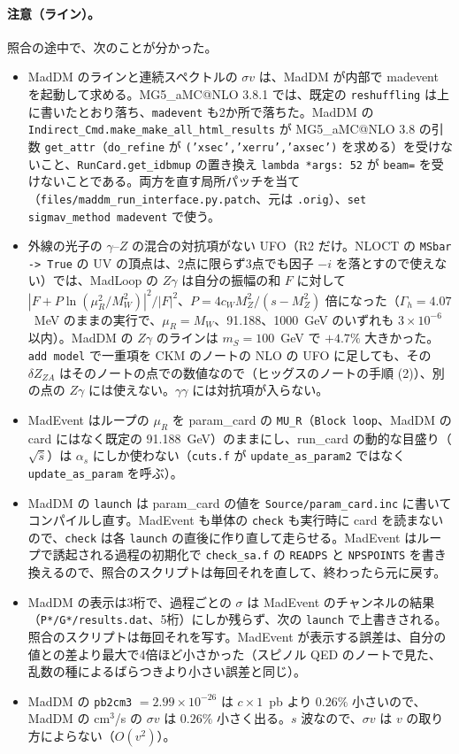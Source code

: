 \documentclass[a4paper,10pt]{ltjsarticle}
\makeatletter
\newcommand{\MGaMC}{MG5\_aMC@NLO}
\makeatother
\begin{document}
\paragraph{注意（ライン）。}照合の途中で、次のことが分かった。
\begin{itemize}
\item MadDM のラインと連続スペクトルの $\sigma v$ は、MadDM が内部で madevent を起動して求める。\MGaMC{} 3.8.1 では、既定の \texttt{reshuffling} は上に書いたとおり落ち、\texttt{madevent} も2か所で落ちた。MadDM の \texttt{Indirect\_Cmd.make\_make\_all\_html\_results} が \MGaMC{} 3.8 の引数 \texttt{get\_attr}（\texttt{do\_refine} が \texttt{('xsec','xerru','axsec')} を求める）を受けないこと、\texttt{RunCard.get\_idbmup} の置き換え \texttt{lambda *args: 52} が \texttt{beam=} を受けないことである。両方を直す局所パッチを当て（\nolinkurl{files/maddm_run_interface.py.patch}、元は \texttt{.orig}）、\texttt{set sigmav\_method madevent} で使う。
\item 外線の光子の $\gamma$--$Z$ の混合の対抗項がない UFO（R2 だけ。NLOCT の \texttt{MSbar -> True} の UV の頂点は、2点に限らず3点でも因子 $-i$ を落とすので使えない）では、MadLoop の $Z\gamma$ は自分の振幅の和 $F$ に対して $|F+P\ln(\mu_R^2/M_W^2)|^2/|F|^2$、$P=4c_WM_Z^2/(s-M_Z^2)$ 倍になった（$\Gamma_h=4.07$~MeV のままの実行で、$\mu_R=M_W$、91.188、1000~GeV のいずれも $3\times10^{-6}$ 以内）。MadDM の $Z\gamma$ のラインは $m_S=100$~GeV で $+4.7\%$ 大きかった。\texttt{add model} で一重項を CKM のノートの NLO の UFO に足しても、その $\delta Z_{ZA}$ はそのノートの点での数値なので（ヒッグスのノートの手順 (2)）、別の点の $Z\gamma$ には使えない。$\gamma\gamma$ には対抗項が入らない。
\item MadEvent はループの $\mu_R$ を param\_card の \texttt{MU\_R}（\texttt{Block loop}、MadDM の card にはなく既定の 91.188~GeV）のままにし、run\_card の動的な目盛り（$\sqrt{\hat s}$）は $\alpha_s$ にしか使わない（\texttt{cuts.f} が \texttt{update\_as\_param2} ではなく \texttt{update\_as\_param} を呼ぶ）。
\item MadDM の \texttt{launch} は param\_card の値を \texttt{Source/param\_card.inc} に書いてコンパイルし直す。MadEvent も単体の \texttt{check} も実行時に card を読まないので、\texttt{check} は各 \texttt{launch} の直後に作り直して走らせる。MadEvent はループで誘起される過程の初期化で \texttt{check\_sa.f} の \texttt{READPS} と \texttt{NPSPOINTS} を書き換えるので、照合のスクリプトは毎回それを直して、終わったら元に戻す。
\item MadDM の表示は3桁で、過程ごとの $\sigma$ は MadEvent のチャンネルの結果（\texttt{P*/G*/results.dat}、5桁）にしか残らず、次の \texttt{launch} で上書きされる。照合のスクリプトは毎回それを写す。MadEvent が表示する誤差は、自分の値との差より最大で4倍ほど小さかった（スピノル QED のノートで見た、乱数の種によるばらつきより小さい誤差と同じ）。
\item MadDM の \texttt{pb2cm3} $=2.99\times10^{-26}$ は $c\times1$~pb より $0.26\%$ 小さいので、MadDM の cm$^3$/s の $\sigma v$ は $0.26\%$ 小さく出る。$s$ 波なので、$\sigma v$ は $v$ の取り方によらない（$O(v^2)$）。
\end{itemize}
\end{document}
